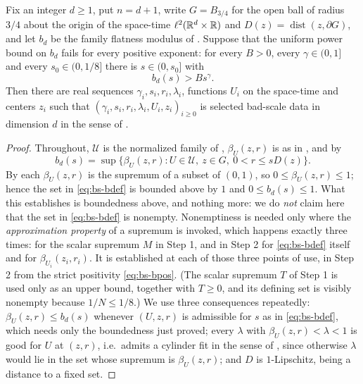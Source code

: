 \begin{lemma}
Fix an integer $d\ge1$, put $n=d+1$, write $G=B_{3/4}$ for the open ball of
radius $3/4$ about the origin of the space-time $\ell^2(\mathbb{R}^d\times\mathbb{R})$ and
$D(z)=\operatorname{dist}(z,\partial G)$, and let $b_d$ be the family flatness
modulus of . Suppose that the uniform power bound on
$b_d$ fails for every positive exponent: for every $B>0$, every
$\gamma\in(0,1]$ and every $s_0\in(0,1/8]$ there is $s\in(0,s_0]$ with
\[
  b_d(s)>Bs^\gamma .
\]
Then there are real sequences $\gamma_i,s_i,r_i,\lambda_i$, functions $U_i$ on
the space-time and centers $z_i$ such that
$(\gamma_i,s_i,r_i,\lambda_i,U_i,z_i)_{i\ge0}$ is selected bad-scale data in
dimension $d$ in the sense of .
\end{lemma}
\begin{proof}
Throughout, $\mathcal U$ is the normalized family of
, $\beta_U(z,r)$ is as in ,
and by 
\begin{equation}\label{eq:bs-bdef}
  b_d(s)=\sup\bigl\{\beta_U(z,r):U\in\mathcal U,\ z\in G,\ 0<r\le sD(z)\bigr\}.
\end{equation}
By  each $\beta_U(z,r)$ is the supremum of a subset of
$(0,1)$, so $0\le\beta_U(z,r)\le1$; hence the set in \eqref{eq:bs-bdef} is
bounded above by $1$ and $0\le b_d(s)\le1$. What this establishes is boundedness
above, and nothing more: we do \emph{not} claim here that the set in
\eqref{eq:bs-bdef} is nonempty. Nonemptiness is needed only where the
\emph{approximation property} of a supremum is invoked, which happens exactly
three times: for the scalar supremum $M$ in Step 1, and in Step 2 for
\eqref{eq:bs-bdef} itself and for $\beta_{U_i}(z_i,r_i)$. It is established at
each of those three points of use, in Step 2 from the strict positivity
\eqref{eq:bs-bpos}. (The scalar supremum $T$ of Step 1 is used only as an upper
bound, together with $T\ge0$, and its defining set is visibly nonempty because
$1/N\le1/8$.) We use three consequences repeatedly: $\beta_U(z,r)\le
b_d(s)$ whenever $(U,z,r)$ is admissible for $s$ as in \eqref{eq:bs-bdef}, which
needs only the boundedness just proved; every $\lambda$ with
$\beta_U(z,r)<\lambda<1$ is good for $U$ at $(z,r)$, i.e.\ admits a cylinder fit
in the sense of , since otherwise $\lambda$ would lie in
the set whose supremum is $\beta_U(z,r)$; and $D$ is $1$-Lipschitz, being a
distance to a fixed set.


\end{proof}
